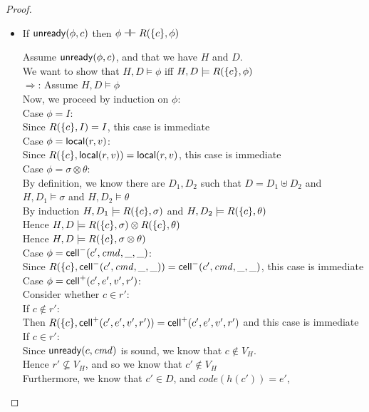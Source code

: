 \begin{proof}
\begin{itemize}
\item If $\mathsf{unready}({\phi}, {c})$ then $\phi \dashv\vdash R(\{{c}\}, \phi)$
\begin{tabbedproof}
\oo Assume $\mathsf{unready}({\phi}, {c})$, and that we have $H$ and $D$. \\
\oo We want to show that $H, D \models \phi$ iff $H, D \models R(\{{c}\}, \phi)$ \\
\oo $\Rightarrow$: Assume $H, D \models \phi$ \\
\ooo Now, we proceed by induction on $\phi$: \\
\ooo Case $\phi = I$: \\
\oooo Since $R(\{{c}\}, I) = I$, this case is immediate \\
\ooo Case $\phi = \mathsf{local}({r}, {v})$: \\
\oooo Since $R(\{{c}\}, \mathsf{local}({r}, {v})) = \mathsf{local}({r}, {v})$, this case is immediate \\
\ooo Case $\phi = \sigma \otimes \theta$: \\
\oooo By definition, we know there are $D_1, D_2$ such that $D = D_1 \uplus D_2$ and \\
\ooox $H, D_1 \models \sigma$ and $H, D_2 \models \theta$ \\
\oooo By induction $H, D_1 \models R(\{{c}\}, \sigma)$ and $H, D_2 \models R(\{{c}\}, \theta)$ \\
\oooo Hence $H, D \models R(\{{c}\}, \sigma) \otimes R(\{{c}\}, \theta)$ \\
\oooo Hence $H, D \models R(\{{c}\}, \sigma \otimes \theta)$ \\
\ooo Case $\phi = \mathsf{cell}^{-}({c'}, {\mathit{cmd}}, {\_}, {\_})$: \\
\oooo Since $R(\{{c}\}, \mathsf{cell}^{-}({c'}, {\mathit{cmd}}, {\_}, {\_})) = \mathsf{cell}^{-}({c'}, {\mathit{cmd}}, {\_}, {\_})$, this case is immediate \\
\ooo Case $\phi = \mathsf{cell}^{+}({c'}, {e'}, {v'}, {r'})$: \\
\oooo Consider whether $c \in r'$: \\
\oooo If $c \not\in r'$: \\
\ooooo Then $R(\{{c}\}, \mathsf{cell}^{+}({c'}, {e'}, {v'}, {r'})) = \mathsf{cell}^{+}({c'}, {e'}, {v'}, {r'})$ and this case is immediate \\
\oooo If $c \in r'$: \\
\ooooo Since $\mathsf{unready}({c}, {\mathit{cmd}})$ is sound, we know that $c \not\in V_H$. \\ 
\ooooo Hence $r' \not\subseteq V_H$, and so we know that $c' \not\in V_H$ \\
\ooooo Furthermore, we know that $c' \in D$, and $\mathit{code}(h(c')) = e'$, \\

\end{tabbedproof}
\end{itemize}
\end{proof}
